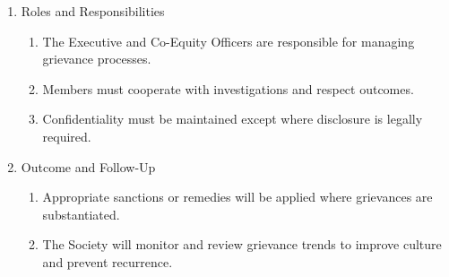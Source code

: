 \begin{enumerate}
\item Roles and Responsibilities
  \begin{enumerate}
  \item The Executive and Co-Equity Officers are responsible for managing grievance processes.
  \item Members must cooperate with investigations and respect outcomes.
  \item Confidentiality must be maintained except where disclosure is legally required.
  \end{enumerate}

\item Outcome and Follow-Up
  \begin{enumerate}
  \item Appropriate sanctions or remedies will be applied where grievances are substantiated.
  \item The Society will monitor and review grievance trends to improve culture and prevent recurrence.
  \end{enumerate}
\end{enumerate}
